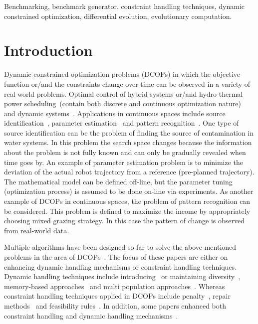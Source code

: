 \documentclass[review]{elsarticle}
\begin{document}
\begin{frontmatter}
\begin{keyword}
Benchmarking, benchmark generator, constraint handling techniques, dynamic constrained optimization, 
differential evolution, evolutionary computation.

\end{keyword}


\end{frontmatter}

\linenumbers



\section{Introduction}
\label{sec:Intro}
Dynamic constrained optimization problems (DCOPs) in which the objective function or/and the constraints change over time can be observed in a variety of real world problems. Optimal control of hybrid systems or/and hydro-thermal power scheduling~\citep{deb2007dynamic}(contain both discrete and continuous optimization nature)~\citep{de2008plant} and dynamic systems~\citep{dini2006building}. Applications in continuous spaces include source identification~\citep{liu2008adaptive}, parameter estimation~\citep{prata2006simultaneous} and pattern recognition~\citep{pantrigo2008multi}.
One type of source identification can be the problem of finding the source of contamination in water systems. In this problem the search space changes because the information about the problem is not fully known and can only be gradually revealed when time goes by. An example of parameter estimation problem is to minimize the deviation of the actual robot trajectory from a reference (pre-planned trajectory). The mathematical model can be defined off-line, but the parameter tuning (optimization process) is assumed to be done on-line via experiments.
As another example of DCOPs in continuous spaces, the problem of pattern recognition can be considered. This problem is defined to maximize the income by appropriately choosing mixed grazing strategy. In this case the pattern of change is observed from real-world data.

Multiple algorithms have been designed so far to solve the above-mentioned problems in the area of DCOPs~\citep{ECDCOPs, Nguyen20121,Yaneli2016}. The focus of these papers are either on enhancing dynamic handling mechanisms or constraint handling techniques. Dynamic handling techniques include introducing~\citep{Goh_2009} or maintaining diversity~\citep{Bui2005}, memory-based approaches~\citep{Richter2013} and multi population approaches~\cite{branke2000multi}.
Whereas constraint handling techniques applied in DCOPs include penalty~\citep{CEC09}, repair methods~\citep{Das,bu2017continuous,nguyen2012continuous} and feasibility rules~\citep{ameca2014differential}.
In addition, some papers enhanced both constraint handling and dynamic handling mechanisms~\citep{Nguyen20121,Yaneli2016}.
\end{document}
